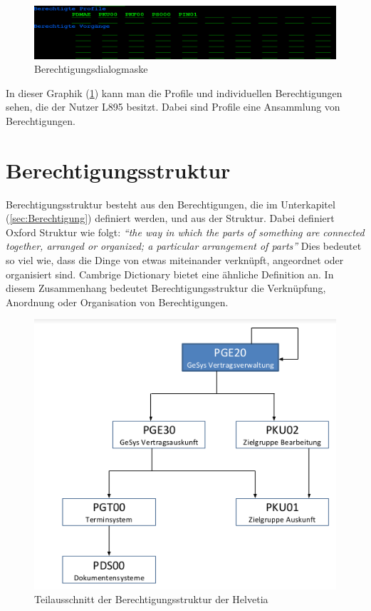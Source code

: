 \newline
\begin{figure}[h!]
 \centering
 \includegraphics[width=1\textwidth]{gfx/Picture/Berechtigung.PNG}
 \caption{Berechtigungsdialogmaske}
 \label{fig:Berch}
\end{figure}
In dieser Graphik (\ref{fig:Berch}) kann man die Profile und individuellen Berechtigungen sehen, die der Nutzer L895 besitzt.
Dabei sind Profile eine Ansammlung von Berechtigungen.

\section{Berechtigungsstruktur}
\label{sec:Berechtigungsstruktur}
Berechtigungsstruktur besteht aus den Berechtigungen, die im Unterkapitel (\ref{sec:Berechtigung}) definiert werden, und aus der Struktur.
Dabei definiert Oxford Struktur wie folgt:
\newline
\newline
\textit{"`the way in which the parts of something are connected together, arranged or organized; a particular arrangement of parts"'} \cite{Struct}
\newline
\newline
Dies bedeutet so viel wie, dass die Dinge von etwas miteinander verknüpft, angeordnet oder organisiert sind. \cite{Struct}
Cambrige Dictionary bietet eine ähnliche Definition an. \cite {CambStruc} 
\newline
In diesem Zusammenhang bedeutet Berechtigungsstruktur die Verknüpfung, Anordnung oder Organisation von Berechtigungen.
\begin{figure}[h!]
 \centering
 \includegraphics[width=1.25\textwidth]{gfx/Picture/Struktur.PNG}
 \caption{Teilausschnitt der Berechtigungsstruktur der Helvetia}
 \label{fig:Teil}
\end{figure}
